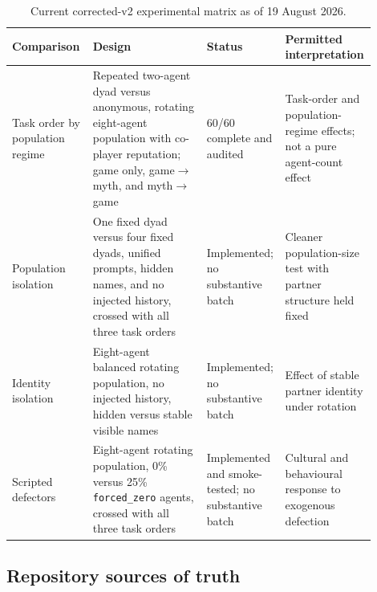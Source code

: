 \begin{table}[t]
\centering
\small
\setlength{\tabcolsep}{3pt}
\caption{Current corrected-v2 experimental matrix as of 19 August 2026.}
\label{tab:current-protocol-matrix}
\begin{tabular}{p{0.22\linewidth}p{0.31\linewidth}p{0.15\linewidth}p{0.22\linewidth}}
\toprule
Comparison & Design & Status & Permitted interpretation \\
\midrule
Task order by population regime & Repeated two-agent dyad versus anonymous,
rotating eight-agent population with co-player reputation; game only,
game$\rightarrow$myth, and myth$\rightarrow$game & 60/60 complete and audited
& Task-order and population-regime effects; not a pure agent-count effect \\
\addlinespace
Population isolation & One fixed dyad versus four fixed dyads, unified prompts,
hidden names, and no injected history, crossed with all three task orders &
Implemented; no substantive batch & Cleaner population-size test with partner
structure held fixed \\
\addlinespace
Identity isolation & Eight-agent balanced rotating population, no injected
history, hidden versus stable visible names & Implemented; no substantive batch
& Effect of stable partner identity under rotation \\
\addlinespace
Scripted defectors & Eight-agent rotating population, 0\% versus 25\%
\texttt{forced\_zero} agents, crossed with all three task orders & Implemented
and smoke-tested; no substantive batch & Cultural and behavioural response to
exogenous defection \\
\bottomrule
\end{tabular}
\end{table}

\subsection{Repository sources of truth}
\label{sec:protocol-source-files}


